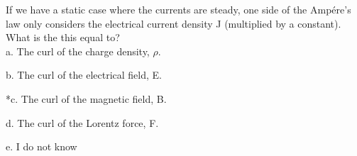 
If we have a static case where the currents are steady, one side of the Ampére's law only considers the electrical current density J (multiplied by a constant). What is the this equal to? \\

a. The curl of the charge density, $ \rho $.

b. The curl of the electrical field, E.

*c. The curl of the magnetic field, B.

d. The curl of the Lorentz force, F.

e. I do not know \\
